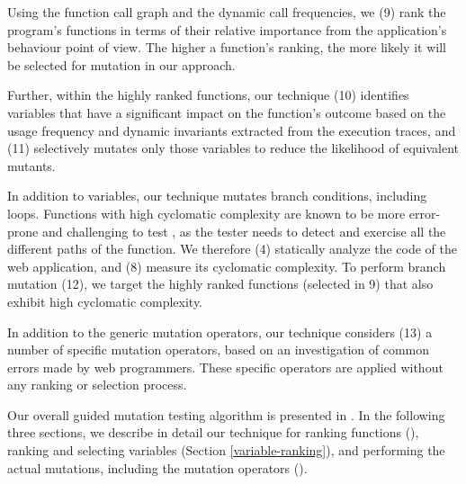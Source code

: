 Using the function call graph and the dynamic call frequencies, we (9) rank the program's functions in terms of their relative importance from the application's behaviour point of view. The higher a function's ranking, the more likely it will be selected for mutation in our approach.

Further, within the highly ranked functions, our technique (10)  identifies variables 
that have a significant impact on the function's outcome based on the 
usage frequency and dynamic invariants extracted from the execution traces, 
and (11) selectively mutates only those variables to reduce the likelihood of equivalent mutants. 

In addition to variables, our technique mutates branch conditions, including loops. %
Functions with high cyclomatic complexity are known to be more error-prone and challenging to test \cite{basili:tse96, nagappan:icse06},  as the tester needs to detect and 
exercise all the different paths of the function. 
We therefore (4) statically analyze
the \javascript code of the web application, and (8) measure its
cyclomatic complexity. To perform branch mutation (12), we target the highly ranked functions (selected in 9) that also exhibit high cyclomatic complexity.

In addition to the generic mutation operators, our technique considers (13) a number of \javascript
specific mutation operators, based on an investigation of common errors made by web programmers. %
These specific operators are applied without any ranking or selection process. %

Our overall guided mutation testing algorithm is presented in .
In the following three sections, we describe in detail our technique for ranking functions 
(), ranking and selecting variables (Section \ref{variable-ranking}), and performing the actual mutations, including the mutation operators (). 




 
   



  
  